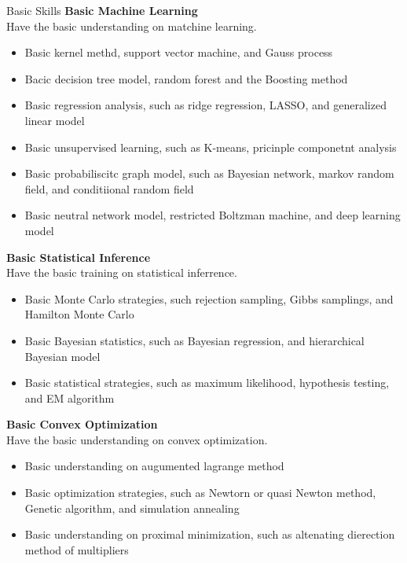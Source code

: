 \documentclass{resume} %
\begin{document}
\begin{rSection}{Basic Skills}
  {\bf Basic Machine Learning }\\
Have the basic understanding on matchine learning. 
  \vspace{-3mm}
  \begin{itemize}
\item  Basic kernel methd, support vector machine, and Gauss process
\item Bacic decision tree model, random forest and the Boosting method
\item Basic regression analysis, such as ridge regression, LASSO, and generalized linear model
\item Basic unsupervised learning,  such as K-means, pricinple componetnt analysis
\item Basic probabiliscitc graph model, such as Bayesian network, markov random field, and conditiional random field
\item Basic neutral network model, restricted Boltzman machine, and deep learning model
  \end{itemize}
{\bf Basic Statistical Inference}\\
Have the basic training on statistical inferrence. 
\vspace{-3mm}
\begin{itemize}
\item Basic Monte Carlo strategies, such rejection sampling, Gibbs samplings, and Hamilton Monte Carlo
\item Basic Bayesian statistics, such as Bayesian regression, and hierarchical Bayesian model
\item Basic statistical strategies, such as maximum likelihood, hypothesis testing, and EM algorithm
\end{itemize}
{\bf Basic Convex Optimization}\\
Have the basic understanding on convex optimization.
\vspace{-3mm}
\begin{itemize}
\item Basic understanding on augumented lagrange method
\item Basic optimization strategies, such as Newtorn or quasi Newton method, Genetic algorithm, and simulation annealing
\item Basic understanding on proximal minimization, such as altenating dierection method of multipliers
\end{itemize}
\end{rSection}
\end{document}
